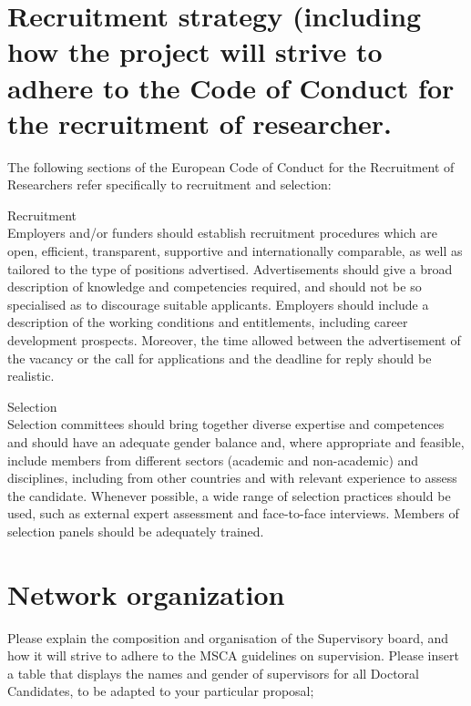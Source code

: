 \documentclass[11pt]{article}
\begin{document}
\setcounter{section}{3}
\setcounter{page}{34}

\tableofcontents



\newpage

\section{Recruitment strategy (including how the project will strive to adhere to the Code of Conduct for the recruitment of researcher.}

 The following sections of the European Code of Conduct for the Recruitment of Researchers refer specifically to recruitment and selection:

Recruitment\\
Employers and/or funders should establish recruitment procedures which are open, efficient, transparent, supportive and internationally comparable, as well as tailored to the type of positions advertised.
Advertisements should give a broad description of knowledge and competencies required, and should not be so specialised as to discourage suitable applicants. Employers should include a description of the working conditions and entitlements, including career development prospects. Moreover, the time allowed between the advertisement of the vacancy or the call for applications and the deadline for reply should be realistic.

Selection\\
Selection committees should bring together diverse expertise and competences and should have an adequate gender balance and, where appropriate and feasible, include members from different sectors (academic and non-academic) and disciplines, including from other countries and with relevant experience to assess the candidate. Whenever possible, a wide range of selection practices should be used, such as external expert assessment and face-to-face interviews. Members of selection panels should be adequately trained.






\section{Network organization}

Please explain the composition and organisation of the Supervisory board, and how it will strive to adhere to the MSCA guidelines on supervision.
Please insert a table that displays the names and gender of supervisors for all Doctoral Candidates, to be adapted to your particular proposal;
\end{document}
